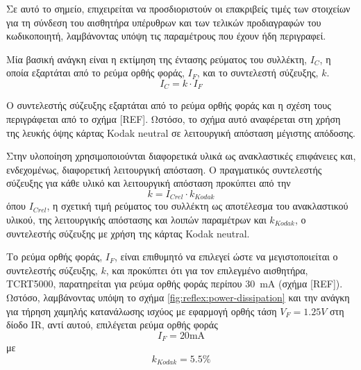 Σε αυτό το σημείο, επιχειρείται να προσδιοριστούν οι επακριβείς τιμές των
στοιχείων για τη σύνδεση του αισθητήρα υπέρυθρων και των τελικών προδιαγραφών
του κωδικοποιητή, λαμβάνοντας υπόψη τις παραμέτρους που έχουν ήδη περιγραφεί.

Μία βασική ανάγκη είναι η εκτίμηση της έντασης ρεύματος του συλλέκτη, ${I_C}$, η
οποία εξαρτάται από το ρεύμα ορθής φοράς, $I_F$, και το συντελεστή σύζευξης,
$k$.
\begin{equation}
I_C = k \cdot I_F \label{eq:reflex:i-c}
\end{equation}

Ο συντελεστής σύζευξης εξαρτάται από το ρεύμα ορθής φοράς και η σχέση τους
περιγράφεται από το σχήμα [REF]. Ωστόσο, το σχήμα αυτό αναφέρεται στη χρήση της
λευκής όψης κάρτας Kodak neutral σε λειτουργική απόσταση μέγιστης απόδοσης.

Στην υλοποίηση χρησιμοποιούνται διαφορετικά υλικά ως ανακλαστικές επιφάνειες
και, ενδεχομένως, διαφορετική λειτουργική απόσταση. Ο πραγματικός συντελεστής
σύζευξης για κάθε υλικό και λειτουργική απόσταση προκύπτει από την
\begin{equation}
k = I_{Crel} \cdot k_{Kodak} \label{eq:reflex:k}
\end{equation}
όπου $I_{Crel}$, η σχετική τιμή ρεύματος του συλλέκτη ως αποτέλεσμα του
ανακλαστικού υλικού, της λειτουργικής απόστασης και λοιπών παραμέτρων και
$k_{Kodak}$, ο συντελεστής σύζευξης με χρήση της κάρτας Kodak neutral.


Το ρεύμα ορθής φοράς, $I_F$, είναι επιθυμητό να επιλεγεί ώστε να μεγιστοποιείται
ο συντελεστής σύζευξης, $k$, και προκύπτει ότι για τον επιλεγμένο αισθητήρα,
TCRT5000, παρατηρείται για ρεύμα ορθής φοράς περίπου 30~mA (σχήμα [REF]).
Ωστόσο, λαμβάνοντας υπόψη το σχήμα \ref{fig:reflex:power-dissipation} και την
ανάγκη για τήρηση χαμηλής κατανάλωσης ισχύος με εφαρμογή ορθής τάση
$V_F = 1.25V$ στη δίοδο IR, αντί αυτού, επιλέγεται ρεύμα ορθής φοράς
\begin{equation}
I_F = 20\text{mA} \label{eq:reflex:i-f_value}
\end{equation}
με
\begin{equation}
k_{Kodak} = 5.5\% \label{eq:reflex:k_kodak-value}
\end{equation}


